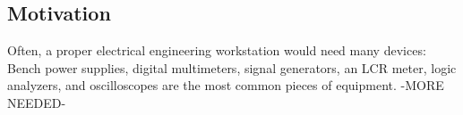 \subsection{Motivation}
Often, a proper electrical engineering workstation would need many devices: Bench power supplies, digital multimeters, signal generators, an LCR meter, logic analyzers, and oscilloscopes are the most common pieces of equipment.  -MORE NEEDED-
